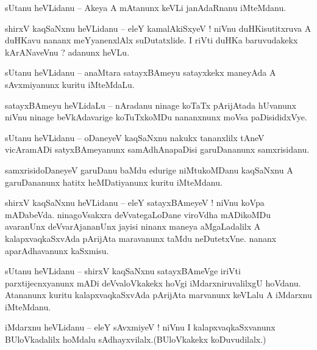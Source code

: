 \documentclass{article}
\begin{document}
\begin{mn}%
sUtanu heVLidanu -- Akeya A mAtanunx keVLi janAdaRnanu iMteMdanu.
\end{mn}

\begin{mn}%
shirxV kaqSaNxnu heVLidanu -- eleY kamalAkiSxyeV ! niVnu duHKisutitxruva A duHKavu nananx 
meYyanenxlAlx suDutatxlide. I riVti duHKa baruvudakekx kArANaveVnu ? adanunx heVLu.
\end{mn}

\begin{mn}%
sUtanu heVLidanu -- anaMtara satayxBAmeyu satayxkekx maneyAda A sAvxmiyanunx kuritu iMteMdaLu.
\end{mn}

\begin{mn}%
satayxBAmeyu heVLidaLu -- nAradanu ninage koTaTx pArijAtada hUvanunx niVnu ninage beVkAdavarige 
koTuTxkoMDu nananxnunx moVsa paDisididxVye.
\end{mn}

\begin{mn}%
sUtanu heVLidanu -- oDaneyeV kaqSaNxnu nakukx tananxlilx tAneV vicAramADi satyxBAmeyanunx 
samAdhAnapaDisi garuDananunx samxrisidanu.
\end{mn}

\begin{mn}%
samxrisidoDaneyeV garuDanu baMdu edurige niMtukoMDanu kaqSaNxnu A garuDananunx hatitx heMDatiyanunx 
kuritu iMteMdanu.
\end{mn}

\begin{mn}%
shirxV kaqSaNxnu heVLidanu -- eleY satayxBAmeyeV ! niVnu koVpa mADabeVda. ninagoVsakxra 
deVvategaLoDane viroVdha mADikoMDu avaranUnx deVvarAjananUnx jayisi ninanx maneya aMgaLadalilx A 
kalapxvaqkaSxvAda pArijAta maravanunx taMdu neDutetxVne. nananx aparAdhavanunx kaSxmisu.
\end{mn}

\begin{mn}%
sUtanu heVLidanu -- shirxV kaqSaNxnu satayxBAmeVge iriVti parxtijecnxyanunx mADi deVvaloVkakekx 
hoVgi iMdarxniruvalilxgU hoVdanu. Atananunx kuritu kalapxvaqkaSxvAda pArijAta marvanunx keVLalu A 
iMdarxnu iMteMdanu.
\end{mn}

\begin{mn}%
iMdarxnu heVLidanu -- eleY sAvxmiyeV ! niVnu I kalapxvaqkaSxvanunx BUloVkadalilx hoMdalu 
sAdhayxvilalx.(BUloVkakekx koDuvudilalx.)
\end{mn}
\end{document}
